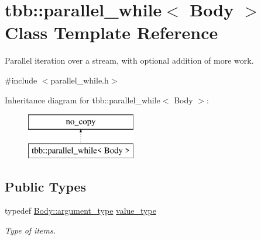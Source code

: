 \hypertarget{classtbb_1_1parallel__while}{}\section{tbb\+:\+:parallel\+\_\+while$<$ Body $>$ Class Template Reference}
\label{classtbb_1_1parallel__while}


Parallel iteration over a stream, with optional addition of more work.  




{\ttfamily \#include $<$parallel\+\_\+while.\+h$>$}

Inheritance diagram for tbb\+:\+:parallel\+\_\+while$<$ Body $>$\+:\begin{figure}[H]
\begin{center}
\leavevmode
\includegraphics[height=2.000000cm]{classtbb_1_1parallel__while}
\end{center}
\end{figure}
\subsection*{Public Types}
\begin{DoxyCompactItemize}
\item 
\hypertarget{classtbb_1_1parallel__while_a2442f019427e608d46801376267e44a8}{}typedef \hyperlink{classCell}{Body\+::argument\+\_\+type} \hyperlink{classtbb_1_1parallel__while_a2442f019427e608d46801376267e44a8}{value\+\_\+type}\label{classtbb_1_1parallel__while_a2442f019427e608d46801376267e44a8}

\begin{DoxyCompactList}\small\item\em Type of items. \end{DoxyCompactList}\end{DoxyCompactItemize}
